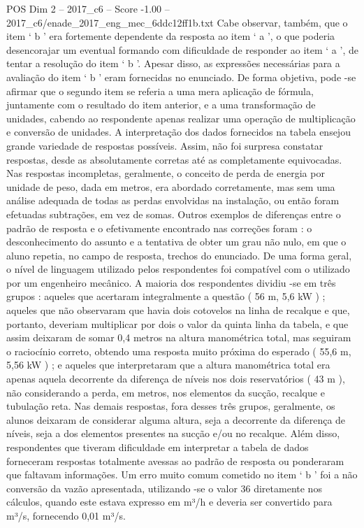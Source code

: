 \begin{textsample}{POS Dim 2 – 2017\_c6 – Score -1.00 – 2017\_c6/enade\_2017\_eng\_mec\_6ddc12ff1b.txt}
Cabe observar, também, que o item ‘ b ’ era fortemente dependente da resposta ao item ‘ a ’, o que poderia desencorajar um eventual formando com dificuldade de responder ao item ‘ a ’, de tentar a resolução do item ‘ b ’.
Apesar disso, as expressões necessárias para a avaliação do item ‘ b ’ eram fornecidas no enunciado.
De forma objetiva, pode -se afirmar que o segundo item se referia a uma mera aplicação de fórmula, juntamente com o resultado do item anterior, e a uma transformação de unidades, cabendo ao respondente apenas realizar uma operação de multiplicação e conversão de unidades.
A interpretação dos dados fornecidos na tabela ensejou grande variedade de respostas possíveis.
Assim, não foi surpresa constatar respostas, desde as absolutamente corretas até as completamente equivocadas.
Nas respostas incompletas, geralmente, o conceito de perda de energia por unidade de peso, dada em metros, era abordado corretamente, mas sem uma análise adequada de todas as perdas envolvidas na instalação, ou então foram efetuadas subtrações, em vez de somas.
Outros exemplos de diferenças entre o padrão de resposta e o efetivamente encontrado nas correções foram : o desconhecimento do assunto e a tentativa de obter um grau não nulo, em que o aluno repetia, no campo de resposta, trechos do enunciado.
De uma forma geral, o nível de linguagem utilizado pelos respondentes foi compatível com o utilizado por um engenheiro mecânico.
A maioria dos respondentes dividiu -se em três grupos : aqueles que acertaram integralmente a questão ( 56 m, 5,6 kW ) ; aqueles que não observaram que havia dois cotovelos na linha de recalque e que, portanto, deveriam multiplicar por dois o valor da quinta linha da tabela, e que assim deixaram de somar 0,4 metros na altura manométrica total, mas seguiram o raciocínio correto, obtendo uma resposta muito próxima do esperado ( 55,6 m, 5,56 kW ) ; e aqueles que interpretaram que a altura manométrica total era apenas aquela decorrente da diferença de níveis nos dois reservatórios ( 43 m ), não considerando a perda, em metros, nos elementos da sucção, recalque e tubulação reta.
Nas demais respostas, fora desses três grupos, geralmente, os alunos deixaram de considerar alguma altura, seja a decorrente da diferença de níveis, seja a dos elementos presentes na sucção e/ou no recalque.
Além disso, respondentes que tiveram dificuldade em interpretar a tabela de dados forneceram respostas totalmente avessas ao padrão de resposta ou ponderaram que faltavam informações.
Um erro muito comum cometido no item ‘ b ’ foi a não conversão da vazão apresentada, utilizando -se o valor 36 diretamente nos cálculos, quando este estava expresso em m³/h e deveria ser convertido para m³/s, fornecendo 0,01 m³/s.

\end{textsample}
